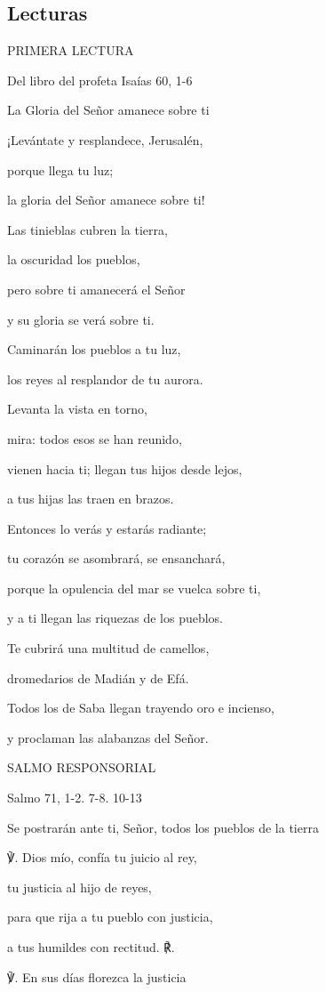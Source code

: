 \begin{body}
\begin{body}
\section{Lecturas}

PRIMERA LECTURA

Del libro del profeta Isaías 60, 1-6

La Gloria del Señor amanece sobre ti

¡Levántate y resplandece, Jerusalén,

porque llega tu luz;

la gloria del Señor amanece sobre ti!

Las tinieblas cubren la tierra,

la oscuridad los pueblos,

pero sobre ti amanecerá el Señor

y su gloria se verá sobre ti.

Caminarán los pueblos a tu luz,

los reyes al resplandor de tu aurora.

Levanta la vista en torno,

mira: todos esos se han reunido,

vienen hacia ti; llegan tus hijos desde lejos,

a tus hijas las traen en brazos.

Entonces lo verás y estarás radiante;

tu corazón se asombrará, se ensanchará,

porque la opulencia del mar se vuelca sobre ti,

y a ti llegan las riquezas de los pueblos.

Te cubrirá una multitud de camellos,

dromedarios de Madián y de Efá.

Todos los de Saba llegan trayendo oro e incienso,

y proclaman las alabanzas del Señor.

SALMO RESPONSORIAL

Salmo 71, 1-2. 7-8. 10-13

Se postrarán ante ti, Señor, todos los pueblos de la tierra

℣. Dios mío, confía tu juicio al rey,

tu justicia al hijo de reyes,

para que rija a tu pueblo con justicia,

a tus humildes con rectitud. ℟.

℣. En sus días florezca la justicia


\end{body}
\end{body}
